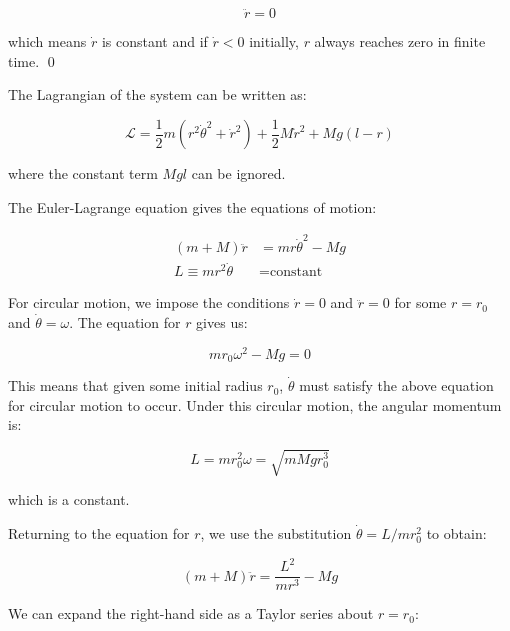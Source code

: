 \documentclass[12pt]{article}
\begin{document}
\begin{equation}
    \ddot{r} = 0
\end{equation}

which means $\dot{r}$ is constant and if $\dot{r} <0$ initially, $r$ always reaches zero in finite time.
\qed



The Lagrangian of the system can be written as:

\begin{equation}
    \mathcal{L} = \frac{1}{2} m \left( r^{2} \dot{\theta}^{2} + \dot{r}^{2} \right) + \frac{1}{2} M \dot{r}^{2} + Mg(l-r)
\end{equation}

where the constant term $Mgl$ can be ignored.

The Euler-Lagrange equation gives the equations of motion:

\begin{equation}
\begin{split}
    (m + M) \ddot{r} &= mr\dot{\theta}^{2} - Mg \\
    L \equiv mr^{2}\dot{\theta} &= \text{constant}
\end{split}
\end{equation}

For circular motion, we impose the conditions $\dot{r} = 0$ and $\ddot{r} = 0$ for some $r = r_{0}$ and $\dot{\theta} = \omega$. The equation for $r$ gives us:

\begin{equation}
    mr_{0}\omega^{2} - Mg = 0
\end{equation}

This means that given some initial radius $r_{0}$, $\dot{\theta}$ must satisfy the above equation for circular motion to occur. Under this circular motion, the angular momentum is:

\begin{equation}
    L = mr_{0}^{2}\omega = \sqrt{mMg r_{0}^{3}}
\end{equation}

which is a constant.

Returning to the equation for $r$, we use the substitution $\dot{\theta} = L/mr_{0}^{2}$ to obtain:

\begin{equation}
    (m + M) \ddot{r} = \frac{L^{2}}{mr^{3}} - Mg
\end{equation}

We can expand the right-hand side as a Taylor series about $r = r_{0}$:
\end{document}
